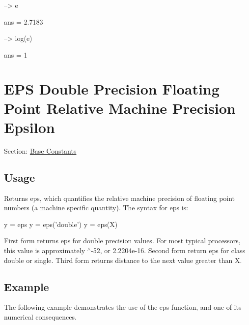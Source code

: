 \begin{DoxyVerbInclude}
--> e

ans = 
    2.7183 

--> log(e)

ans = 
 1 
\end{DoxyVerbInclude}
 \hypertarget{constants_eps}{}\section{E\-P\-S Double Precision Floating Point Relative Machine Precision Epsilon}\label{constants_eps}
Section\-: \hyperlink{sec_constants}{Base Constants} \hypertarget{vtkwidgets_vtkxyplotwidget_Usage}{}\subsection{Usage}\label{vtkwidgets_vtkxyplotwidget_Usage}
Returns {\ttfamily eps}, which quantifies the relative machine precision of floating point numbers (a machine specific quantity). The syntax for {\ttfamily eps} is\-: \begin{DoxyVerb}   y = eps
   y = eps('double')
   y = eps(X)
\end{DoxyVerb}
 First form returns {\ttfamily eps} for {\ttfamily double} precision values. For most typical processors, this value is approximately {$^\wedge$-\/52}, or 2.\-2204e-\/16. Second form return {\ttfamily eps} for class {\ttfamily double} or {\ttfamily single}. Third form returns distance to the next value greater than X. \hypertarget{variables_struct_Example}{}\subsection{Example}\label{variables_struct_Example}
The following example demonstrates the use of the {\ttfamily eps} function, and one of its numerical consequences.


